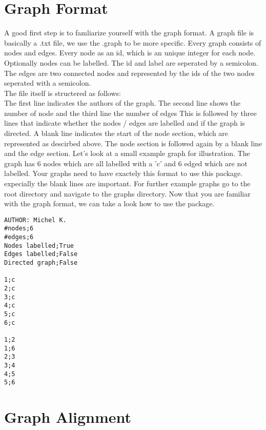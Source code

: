 \documentclass{SeminarV2}
\begin{document}
\section{Graph Format}

A good first step is to famliarize yourself with the graph format. A graph
file is basically a .txt file, we use the .graph to be more specific.
Every graph consists of nodes and edges. Every node as an id, which is an unique
integer for each node. Optionally nodes can be labelled. The id and label are
seperated by a semicolon. The edges are two connected nodes and represented
by the ids of the two nodes seperated with a semicolon.\\
The file itself is structered as follows: \\
The first line indicates the authors of the graph. The second line shows the number
of node and the third line the number of edges
This is followed by three lines
that indicate whether the nodes / edges are labelled and if the graph is directed.
A blank line indicates the start of the node section, which are represented as
descirbed above. The node section is followed again by a blank line and the edge section.
Let's look at a small example graph for illustration. The graph has 6 nodes
which are all labelled with a 'c' and 6 edged which are not labelled.
Your graphs need to have exactely this format to use this package. expecially
the blank lines are important. For further example graphs go to the root
directory and navigate to the graphs directory. Now that you are familiar with
the graph format, we can take a look how to use the package.
\begin{verbatim}
AUTHOR: Michel K.
#nodes;6
#edges;6
Nodes labelled;True
Edges labelled;False
Directed graph;False

1;c
2;c
3;c
4;c
5;c
6;c

1;2
1;6
2;3
3;4
4;5
5;6
\end{verbatim}

\section{Graph Alignment}









\end{document}
